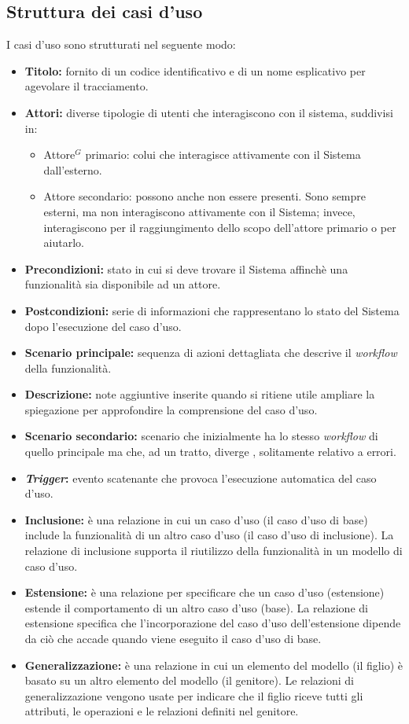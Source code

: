 \subsection{Struttura dei casi d'uso}
I casi d'uso sono strutturati nel seguente modo:
\begin{itemize}
	\item \textbf{Titolo:} fornito di un codice identificativo e di un nome esplicativo per agevolare il tracciamento.
	\item \textbf{Attori:} diverse tipologie di utenti che interagiscono con il sistema, suddivisi in:
	\begin{itemize}
		\item Attore$^G$ primario: colui che interagisce attivamente con il Sistema dall'esterno.
		\item Attore secondario: possono anche non essere presenti. 
		Sono sempre esterni, ma non interagiscono attivamente con il Sistema; invece, interagiscono per il raggiungimento dello scopo dell'attore primario o per aiutarlo.
	\end{itemize}
	\item \textbf{Precondizioni:} stato in cui si deve trovare il Sistema affinchè una funzionalità sia disponibile ad un attore.
	\item \textbf{Postcondizioni:} serie di informazioni che rappresentano lo stato del Sistema dopo l'esecuzione del caso d'uso.
	\item \textbf{Scenario principale:} sequenza di azioni dettagliata che descrive il \textit{workflow} della funzionalità.
	\item \textbf{Descrizione:} note aggiuntive inserite quando si ritiene utile ampliare la spiegazione per approfondire la comprensione del caso d'uso.
	\item \textbf{Scenario secondario:} scenario che inizialmente ha lo stesso \textit{workflow} di quello principale ma che, ad un tratto, diverge , solitamente relativo a errori.
	\item \textbf{\textit{Trigger}:} evento scatenante che provoca l'esecuzione automatica del caso d'uso.
	\item \textbf{Inclusione:} è una relazione in cui un caso d'uso (il caso d'uso di base) include la funzionalità di un altro caso d'uso (il caso d'uso di inclusione). 
		La relazione di inclusione supporta il riutilizzo della funzionalità in un modello di caso d'uso.
	\item \textbf{Estensione:} è una relazione per specificare che un caso d'uso (estensione) estende il comportamento di un altro caso d'uso (base).
	La relazione di estensione specifica che l'incorporazione del caso d'uso dell'estensione dipende da ciò che accade quando viene eseguito il caso d'uso di base.
	\item \textbf{Generalizzazione:} è una relazione in cui un elemento del modello (il figlio) è basato su un altro elemento del modello (il genitore). 
		Le relazioni di generalizzazione vengono usate per indicare che il figlio riceve tutti gli attributi, le operazioni e le relazioni definiti nel genitore.
\end{itemize}

